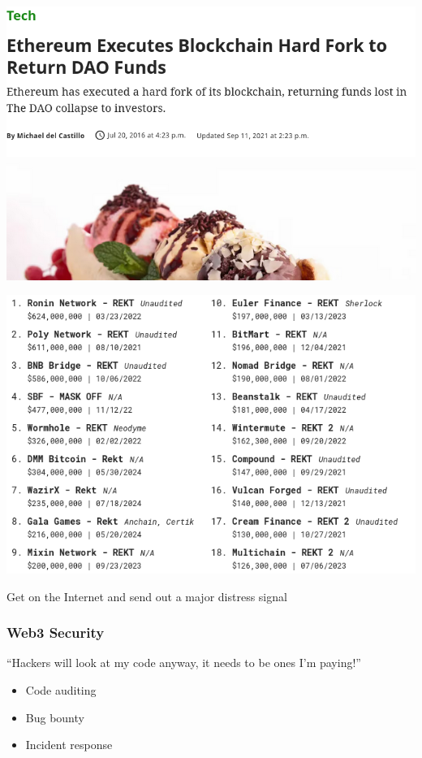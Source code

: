 \documentclass[aspectratio=169,17pt]{beamer}
\begin{document}
\begin{frame}
	\centering
	\includegraphics[height=.9\textheight]{assets/daofork.png}
\end{frame}

\begin{frame}
	\centering
	\includegraphics[height=.9\textheight]{assets/rekt.png}
\end{frame}

\begin{frame}
	Get on the Internet and send out a major distress signal
\end{frame}

\begin{frame}
	\frametitle{Web3 Security}
	``Hackers will look at my code anyway, it needs to be ones I'm paying!''
\end{frame}

\begin{frame}
	\begin{itemize}
		\item Code auditing
		\item Bug bounty
		\item Incident response
	\end{itemize}
\end{frame}
\end{document}
